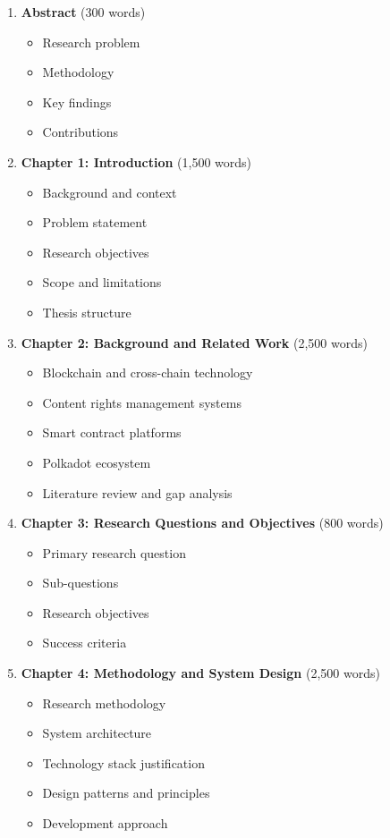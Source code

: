 \documentclass[12pt,a4paper]{article}
\begin{document}
\begin{enumerate}
    \item \textbf{Abstract} (300 words)
    \begin{itemize}[label=--]
        \item Research problem
        \item Methodology
        \item Key findings
        \item Contributions
    \end{itemize}
    
    \item \textbf{Chapter 1: Introduction} (1,500 words)
    \begin{itemize}[label=--]
        \item Background and context
        \item Problem statement
        \item Research objectives
        \item Scope and limitations
        \item Thesis structure
    \end{itemize}
    
    \item \textbf{Chapter 2: Background and Related Work} (2,500 words)
    \begin{itemize}[label=--]
        \item Blockchain and cross-chain technology
        \item Content rights management systems
        \item Smart contract platforms
        \item Polkadot ecosystem
        \item Literature review and gap analysis
    \end{itemize}
    
    \item \textbf{Chapter 3: Research Questions and Objectives} (800 words)
    \begin{itemize}[label=--]
        \item Primary research question
        \item Sub-questions
        \item Research objectives
        \item Success criteria
    \end{itemize}
    
    \item \textbf{Chapter 4: Methodology and System Design} (2,500 words)
    \begin{itemize}[label=--]
        \item Research methodology
        \item System architecture
        \item Technology stack justification
        \item Design patterns and principles
        \item Development approach
    \end{itemize}
    

\end{enumerate}
\end{document}
